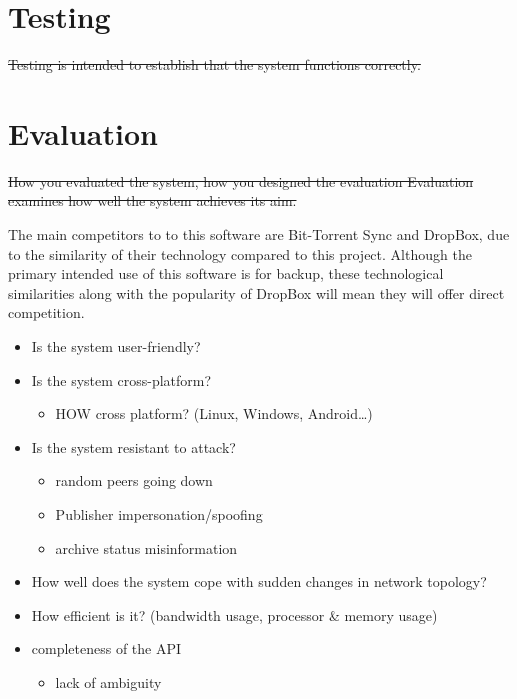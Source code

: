 \documentclass[12pt,a4paper,]{adreport}
\begin{document}
\chapter{Testing}\label{testing}

\sout{Testing is intended to establish that the system functions
correctly.}

\chapter{Evaluation}\label{evaluation}

\sout{How you evaluated the system, how you designed the evaluation
Evaluation examines how well the system achieves its aim.}

The main competitors to to this software are Bit-Torrent Sync and
DropBox, due to the similarity of their technology compared to this
project. Although the primary intended use of this software is for
backup, these technological similarities along with the popularity of
DropBox will mean they will offer direct competition.

\begin{itemize}
\itemsep1pt\parskip0pt
\item
  Is the system user-friendly?
\item
  Is the system cross-platform?

  \begin{itemize}
  \itemsep1pt\parskip0pt
  \item
    HOW cross platform? (Linux, Windows, Android\ldots{})
  \end{itemize}
\item
  Is the system resistant to attack?

  \begin{itemize}
  \itemsep1pt\parskip0pt
  \item
    random peers going down
  \item
    Publisher impersonation/spoofing
  \item
    archive status misinformation
  \end{itemize}
\item
  How well does the system cope with sudden changes in network topology?
\item
  How efficient is it? (bandwidth usage, processor \& memory usage)
\item
  completeness of the API

  \begin{itemize}
  \itemsep1pt\parskip0pt
  \item
    lack of ambiguity
  \end{itemize}
\end{itemize}
\end{document}

